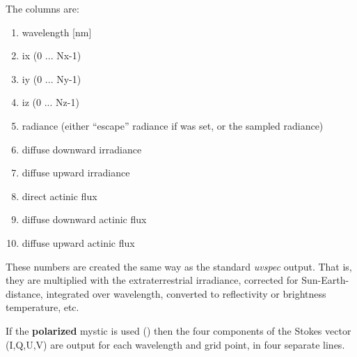 \begin{description}
  The columns are:
  \begin{enumerate}
  \item  wavelength [nm]
  \item  ix (0 ... Nx-1)
  \item  iy (0 ... Ny-1)
  \item  iz (0 ... Nz-1)
  \item  radiance (either ``escape'' radiance if  was set, 
    or the sampled radiance)
  \item  diffuse downward irradiance
  \item  diffuse upward irradiance
  \item  direct actinic flux
  \item  diffuse downward actinic flux
  \item  diffuse upward actinic flux
  \end{enumerate}
  These numbers are created the same way as the standard {\sl uvspec}
  output. That is, they are multiplied with the extraterrestrial irradiance,
  corrected for Sun-Earth-distance, integrated over wavelength, converted to
  reflectivity or brightness temperature, etc. 

  If the {\bf polarized} mystic is used () then the four
  components of the Stokes vector (I,Q,U,V) are output for each wavelength and
  grid point, in four separate lines. 

\end{description}

